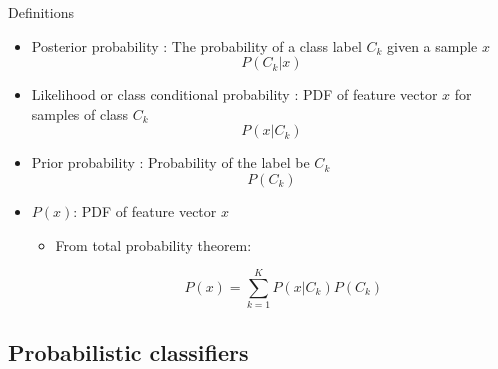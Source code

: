 \documentclass[serif, aspectratio=169]{beamer}
\begin{document}
    \begin{frame}{Definitions}
        \begin{itemize}
            \item Posterior probability : The probability of a class label $C_k$ given a sample $x$
            \[
                P(C_k|x)
            \]

            \item Likelihood or class conditional probability : PDF of feature vector $x$ for samples of class $C_k$
            \[
                P(x|C_k)
            \]

            \item Prior probability : Probability of the label be $C_k$
            \[
                P(C_k)
            \]

            \item $P(x)$: PDF of feature vector $x$
            \begin{itemize}
                \item From total probability theorem:

                \[ P(x)=\sum_{k=1}^{K}P(x|C_k)P(C_k)
                \]
            \end{itemize}

        \end{itemize}
    \end{frame}



    \subsection{Probabilistic classifiers}
\end{document}
